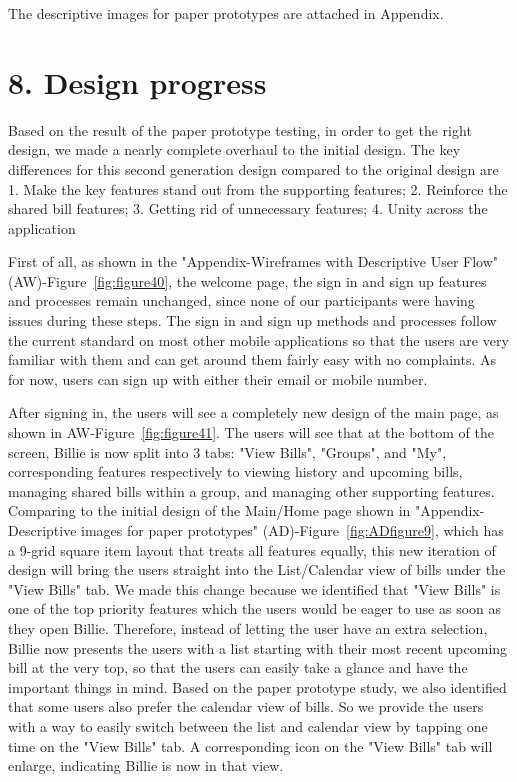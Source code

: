 \documentclass{sigchi}
\begin{document}
The descriptive images for paper prototypes are attached in Appendix. 

\section{8. Design progress}

Based on the result of the paper prototype testing, in order to get the right design, we made a nearly complete overhaul to the initial design. The key differences for this second generation design compared to the original design are 1. Make the key features stand out from the supporting features; 2. Reinforce the shared bill features; 3. Getting rid of unnecessary features; 4. Unity across the application

First of all, as shown in the "Appendix-Wireframes with Descriptive User Flow" (AW)-Figure~\ref{fig:figure40}, the welcome page, the sign in and sign up features and processes remain unchanged, since none of our participants were having issues during these steps. The sign in and sign up methods and processes follow the current standard on most other mobile applications so that the users are very familiar with them and can get around them fairly easy with no complaints. As for now, users can sign up with either their email or mobile number.

After signing in, the users will see a completely new design of the main page, as shown in AW-Figure~\ref{fig:figure41}. The users will see that at the bottom of the screen, Billie is now split into 3 tabs: "View Bills", "Groups", and "My", corresponding features respectively to viewing history and upcoming bills, managing shared bills within a group, and managing other supporting features. Comparing to the initial design of the Main/Home page shown in "Appendix-Descriptive images for paper prototypes" (AD)-Figure~\ref{fig:ADfigure9}, which has a 9-grid square item layout that treats all features equally, this new iteration of design will bring the users straight into the List/Calendar view of bills under the "View Bills" tab. We made this change because we identified that "View Bills" is one of the top priority features which the users would be eager to use as soon as they open Billie. Therefore, instead of letting the user have an extra selection, Billie now presents the users with a list starting with their most recent upcoming bill at the very top, so that the users can easily take a glance and have the important things in mind. Based on the paper prototype study, we also identified that some users also prefer the calendar view of bills. So we provide the users with a way to easily switch between the list and calendar view by tapping one time on the "View Bills" tab. A corresponding icon on the "View Bills" tab will enlarge, indicating Billie is now in that view.
\end{document}
